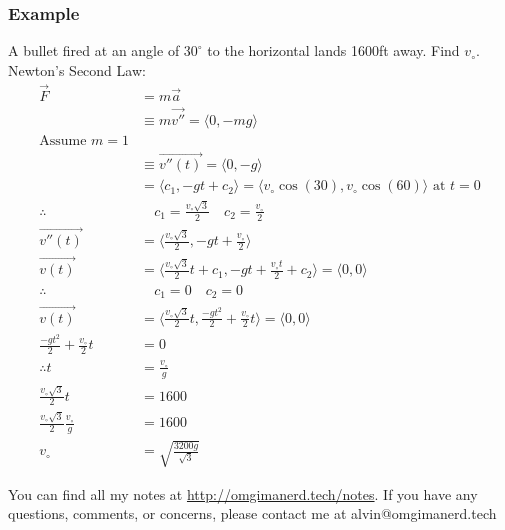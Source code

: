\documentclass{math}
\begin{document}
\subsubsection*{Example}
A bullet fired at an angle of \( 30^{\circ} \) to the horizontal lands 1600ft
away. Find \( v_{\circ} \). \\
Newton's Second Law:
\begin{align*}
  \vec{F} &= m\vec{a} \\
  &\equiv m\vec{v''} = \langle0,-mg\rangle \\
  \text{Assume } m = 1 \\
  &\equiv \overrightarrow{v''(t)} = \langle0,-g\rangle \\
  &= \langle c_1,-gt+c_2\rangle = \langle
    v_{\circ}\cos(30),v_{\circ}\cos(60)\rangle \text{ at } t = 0 \\
  \therefore & \quad c_1 = \frac{v_{\circ}\sqrt{3}}{2} \quad
    c_2 = \frac{v_{\circ}}{2} \\
  \overrightarrow{v''(t)} &= \langle\frac{v_{\circ}\sqrt{3}}{2},-gt+
    \frac{v_{\circ}}{2}\rangle \\
  \overrightarrow{v(t)} &= \langle\frac{v_{\circ}\sqrt{3}}{2}t+c_1,-gt+
    \frac{v_{\circ}t}{2}+c_2\rangle = \langle0,0\rangle \\
  \therefore & \quad c_1 = 0 \quad c_2 = 0 \\
  \overrightarrow{v(t)} &= \langle\frac{v_{\circ}\sqrt{3}}{2}t,
    \frac{-gt^2}{2}+\frac{v_{\circ}}{2}t\rangle = \langle0,0\rangle \\
  \frac{-gt^2}{2}+\frac{v_{\circ}}{2}t &= 0 \\
  \therefore t &= \frac{v_{\circ}}{g} \\
  \frac{v_{\circ}\sqrt{3}}{2}t &= 1600 \\
  \frac{v_{\circ}\sqrt{3}}{2}\frac{v_{\circ}}{g} &= 1600 \\
  v_{\circ} &= \sqrt{\frac{3200g}{\sqrt{3}}}
\end{align*}

\begin{center}
  You can find all my notes at \url{http://omgimanerd.tech/notes}. If you have
  any questions, comments, or concerns, please contact me at
  alvin@omgimanerd.tech
\end{center}
\end{document}
